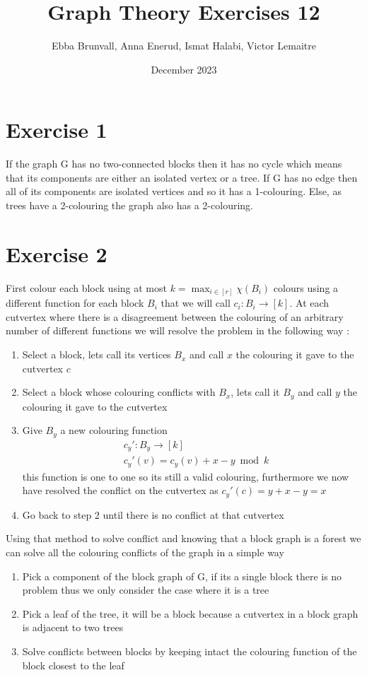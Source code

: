 \documentclass{article}
\title{Graph Theory Exercises 12}
\author{Ebba Brunvall, Anna Enerud, Ismat Halabi, Victor Lemaitre}
\date{December 2023}
\begin{document}
\maketitle

\section*{Exercise 1}
If the graph G has no two-connected blocks then it has no cycle which means that its components are either an isolated vertex or a tree. If G has no edge then all of its components are isolated vertices and so it has a 1-colouring. Else, as trees have a 2-colouring the graph also has a 2-colouring. 

\section*{Exercise 2}
First colour each block using at most $k = \max_{i\in[r]} \chi(B_i)$ colours using a different function for each block $B_i$ that we will call $c_i : B_i \rightarrow [k]$.
At each cutvertex where there is a disagreement between the colouring of an arbitrary number of different functions we will resolve the problem in the following way :
\begin{enumerate}
\item Select a block, lets call its vertices $B_x$ and call $x$ the colouring it gave to the cutvertex $c$
\item Select a block whose colouring conflicts with $B_x$, lets call it $B_y$ and call $y$ the colouring it gave to the cutvertex
\item Give $B_y$ a new colouring function  
\begin{align*} 
&c_y' : B_y \rightarrow [k] \\ 
&c_y'(v) = c_y(v) + x-y \bmod{k}
\end{align*}
this function is one to one so its still a valid colouring, furthermore we now have resolved the conflict on the cutvertex as $c_y'(c) = y + x - y = x$
\item Go back to step 2 until there is no conflict at that cutvertex
\end{enumerate}

Using that method to solve conflict and knowing that a block graph is a forest we can solve all the colouring conflicts of the graph in a simple way 
\begin{enumerate}
\item Pick a component of the block graph of G, if its a single block there is no problem thus we only consider the case where it is a tree
\item Pick a leaf of the tree, it will be a block because a cutvertex in a block graph is adjacent to two trees
\item Solve conflicts between blocks by keeping intact the colouring function of the block closest to the leaf

\end{enumerate}
\end{document}
